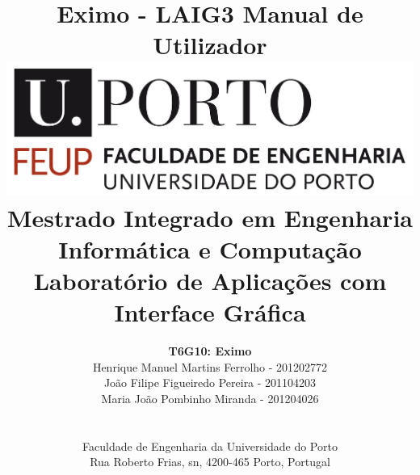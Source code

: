 \documentclass[a4paper]{article}
\begin{document}
\setlength{\textwidth}{16cm}
\setlength{\textheight}{22cm}

\title{\Huge\textbf{Eximo - LAIG3}\linebreak\linebreak\linebreak
\Large\textbf{Manual de Utilizador}\linebreak\linebreak
\linebreak\linebreak
\includegraphics[scale=0.1]{res/feup-logo.png}\linebreak\linebreak
\linebreak\linebreak
\Large{Mestrado Integrado em Engenharia Informática e Computação} \linebreak\linebreak
\Large{Laboratório de Aplicações com Interface Gráfica}\linebreak
}

\author{\textbf{T6G10: Eximo}\\
Henrique Manuel Martins Ferrolho -  201202772\\
João Filipe Figueiredo Pereira - 201104203 \\
Maria João Pombinho Miranda - 201204026 \\
\linebreak\linebreak \\
 \\ Faculdade de Engenharia da Universidade do Porto \\ Rua Roberto Frias, s\/n, 4200-465 Porto, Portugal \linebreak\linebreak\linebreak
\linebreak\linebreak\vspace{1cm}}

\maketitle
\thispagestyle{empty}
\end{document}
